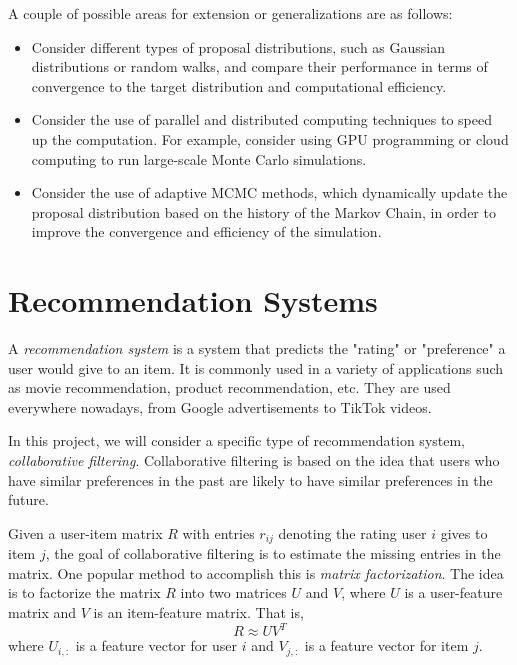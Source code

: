 \documentclass{article}
\begin{document}
    \vspace{3mm}
    A couple of possible areas for extension or generalizations are as follows:
    \begin{itemize}
        \item Consider different types of proposal distributions, such as Gaussian distributions or random walks, and compare their performance in terms of convergence to the target distribution and computational efficiency.
        \item Consider the use of parallel and distributed computing techniques to speed up the computation. For example, consider using GPU programming or cloud computing to run large-scale Monte Carlo simulations.
        \item Consider the use of adaptive MCMC methods, which dynamically update the proposal distribution based on the history of the Markov Chain, in order to improve the convergence and efficiency of the simulation.
    \end{itemize}

\pagebreak 

\section{Recommendation Systems}
    A \textit{recommendation system} is a system that predicts the "rating" or "preference" a user would give to an item. It is commonly used in a variety of applications such as movie recommendation, product recommendation, etc. They are used everywhere nowadays, from Google advertisements to TikTok videos.
    
    \vspace{3mm}
    In this project, we will consider a specific type of recommendation system, \textit{collaborative filtering}. Collaborative filtering is based on the idea that users who have similar preferences in the past are likely to have similar preferences in the future. 
    
    \vspace{3mm}
    Given a user-item matrix $R$ with entries $r_{ij}$ denoting the rating user $i$ gives to item $j$, the goal of collaborative filtering is to estimate the missing entries in the matrix. One popular method to accomplish this is \textit{matrix factorization}. The idea is to factorize the matrix $R$ into two matrices $U$ and $V$, where $U$ is a user-feature matrix and $V$ is an item-feature matrix. That is, $$R \approx UV^T$$ where $U_{i,:}$ is a feature vector for user $i$ and $V_{j,:}$ is a feature vector for item $j$.
    
\end{document}
